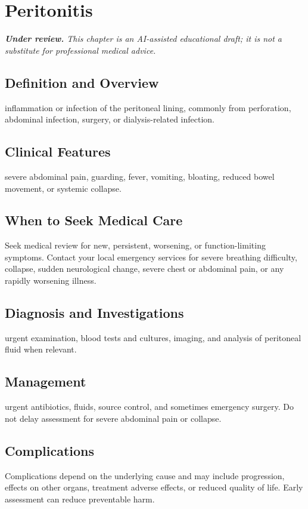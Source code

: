 \chapter{Peritonitis}

\medskip
\noindent\textit{\textbf{Under review.} This chapter is an AI-assisted educational draft; it is not a substitute for professional medical advice.}

\section*{Definition and Overview}
inflammation or infection of the peritoneal lining, commonly from perforation, abdominal infection, surgery, or dialysis-related infection.

\section*{Clinical Features}
severe abdominal pain, guarding, fever, vomiting, bloating, reduced bowel movement, or systemic collapse.

\section*{When to Seek Medical Care}
Seek medical review for new, persistent, worsening, or function-limiting symptoms. Contact your local emergency services for severe breathing difficulty, collapse, sudden neurological change, severe chest or abdominal pain, or any rapidly worsening illness.

\section*{Diagnosis and Investigations}
urgent examination, blood tests and cultures, imaging, and analysis of peritoneal fluid when relevant.

\section*{Management}
urgent antibiotics, fluids, source control, and sometimes emergency surgery. Do not delay assessment for severe abdominal pain or collapse.

\section*{Complications}
Complications depend on the underlying cause and may include progression, effects on other organs, treatment adverse effects, or reduced quality of life. Early assessment can reduce preventable harm.

